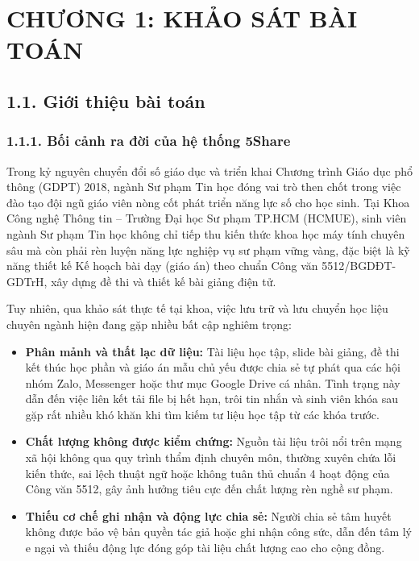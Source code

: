 
\section{CHƯƠNG 1: KHẢO SÁT BÀI TOÁN}

\subsection{1.1. Giới thiệu bài toán}

\subsubsection{1.1.1. Bối cảnh ra đời của hệ thống 5Share}
Trong kỷ nguyên chuyển đổi số giáo dục và triển khai Chương trình Giáo dục phổ thông (GDPT) 2018, ngành Sư phạm Tin học đóng vai trò then chốt trong việc đào tạo đội ngũ giáo viên nòng cốt phát triển năng lực số cho học sinh. Tại Khoa Công nghệ Thông tin -- Trường Đại học Sư phạm TP.HCM (HCMUE), sinh viên ngành Sư phạm Tin học không chỉ tiếp thu kiến thức khoa học máy tính chuyên sâu mà còn phải rèn luyện năng lực nghiệp vụ sư phạm vững vàng, đặc biệt là kỹ năng thiết kế Kế hoạch bài dạy (giáo án) theo chuẩn Công văn 5512/BGDĐT-GDTrH, xây dựng đề thi và thiết kế bài giảng điện tử.

Tuy nhiên, qua khảo sát thực tế tại khoa, việc lưu trữ và lưu chuyển học liệu chuyên ngành hiện đang gặp nhiều bất cập nghiêm trọng:
\begin{itemize}
    \item \textbf{Phân mảnh và thất lạc dữ liệu:} Tài liệu học tập, slide bài giảng, đề thi kết thúc học phần và giáo án mẫu chủ yếu được chia sẻ tự phát qua các hội nhóm Zalo, Messenger hoặc thư mục Google Drive cá nhân. Tình trạng này dẫn đến việc liên kết tải file bị hết hạn, trôi tin nhắn và sinh viên khóa sau gặp rất nhiều khó khăn khi tìm kiếm tư liệu học tập từ các khóa trước.
    \item \textbf{Chất lượng không được kiểm chứng:} Nguồn tài liệu trôi nổi trên mạng xã hội không qua quy trình thẩm định chuyên môn, thường xuyên chứa lỗi kiến thức, sai lệch thuật ngữ hoặc không tuân thủ chuẩn 4 hoạt động của Công văn 5512, gây ảnh hưởng tiêu cực đến chất lượng rèn nghề sư phạm.
    \item \textbf{Thiếu cơ chế ghi nhận và động lực chia sẻ:} Người chia sẻ tâm huyết không được bảo vệ bản quyền tác giả hoặc ghi nhận công sức, dẫn đến tâm lý e ngại và thiếu động lực đóng góp tài liệu chất lượng cao cho cộng đồng.
\end{itemize}

